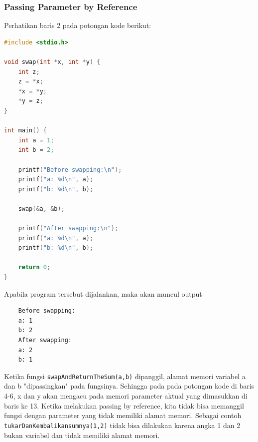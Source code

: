 \subsubsection{Passing Parameter by Reference}
Perhatikan baris 2 pada potongan kode berikut:
\begin{lstlisting}[language=c,caption = Passing by Reference,label=lst:passbyreference01]
#include <stdio.h>

void swap(int *x, int *y) {
    int z;
    z = *x;
    *x = *y;
    *y = z;
}

int main() {
    int a = 1;
    int b = 2;
    
    printf("Before swapping:\n");
    printf("a: %d\n", a);
    printf("b: %d\n", b);
    
    swap(&a, &b);
    
    printf("After swapping:\n");
    printf("a: %d\n", a);
    printf("b: %d\n", b);
    
    return 0;
}
\end{lstlisting}
Apabila program tersebut dijalankan, maka akan muncul output
\begin{verbatim}
    Before swapping:
    a: 1
    b: 2
    After swapping:
    a: 2
    b: 1
\end{verbatim}

Ketika fungsi \verb|swapAndReturnTheSum(a,b)| dipanggil, alamat memori variabel a dan b "dipassingkan" pada fungsinya. Sehingga pada pada potongan kode di baris 4-6, x dan y akan mengacu pada memori parameter aktual yang dimasukkan di baris ke 13. Ketika melakukan passing by reference, kita tidak bisa memanggil fungsi dengan parameter yang tidak memiliki alamat memori. Sebagai contoh \verb|tukarDanKembalikansumnya(1,2)| tidak bisa dilakukan karena angka 1 dan 2 bukan variabel dan tidak memiliki alamat memori.

